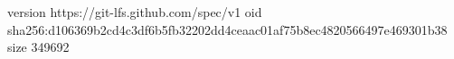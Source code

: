 version https://git-lfs.github.com/spec/v1
oid sha256:d106369b2cd4c3df6b5fb32202dd4ceaac01af75b8ec4820566497e469301b38
size 349692
